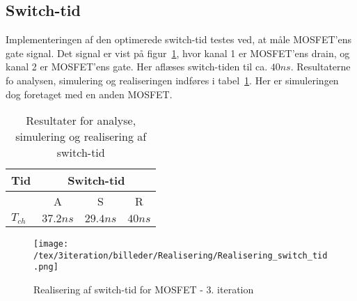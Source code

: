 

\subsection{Switch-tid}
Implementeringen af den optimerede switch-tid testes ved, at måle MOSFET'ens gate signal. Det signal er vist på figur~\ref{fig:realisering_switch_tid_3}, hvor kanal 1 er MOSFET'ens drain, og kanal 2 er MOSFET'ens gate. Her aflæses switch-tiden til ca. $40ns$. Resultaterne fo analysen, simulering og realiseringen indføres i tabel~\ref{tab:resultat_switch_tid_3}. Her er simuleringen dog foretaget med en anden MOSFET.

\begin{table}[H] 			
	\centering
	\begin{tabularx}{\textwidth}{|X|c|c|c|}
		\hline
		\textbf{Tid} & \multicolumn{3}{|c|}{\textbf{Switch-tid}} 										\\ \hline
		& A & S & R 									\\ \hline
		$T_{ch}$ & $37.2ns$ & $29.4ns$ & $40ns$ 											\\ \hline 
		
	\end{tabularx}
	\caption{Resultater for analyse, simulering og realisering af switch-tid}
	\label{tab:resultat_switch_tid_3}
\end{table}

\begin{figure}[H]
	\center
	\texttt{[image: /tex/3iteration/billeder/Realisering/Realisering\_switch\_tid.png]}
	\caption{Realisering af switch-tid for MOSFET - 3. iteration}
	\label{fig:realisering_switch_tid_3}
\end{figure}
